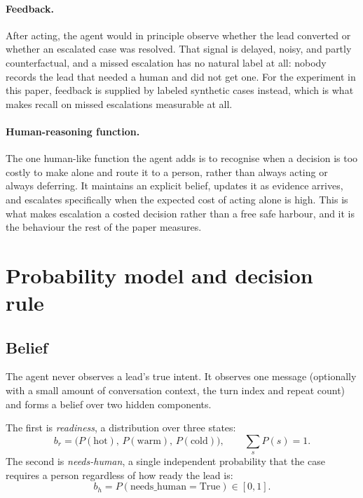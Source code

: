 \documentclass{article}
\begin{document}
\paragraph{Feedback.} After acting, the agent would in principle observe whether
the lead converted or whether an escalated case was resolved. That signal is
delayed, noisy, and partly counterfactual, and a missed escalation has no natural
label at all: nobody records the lead that needed a human and did not get one. For
the experiment in this paper, feedback is supplied by labeled synthetic cases
instead, which is what makes recall on missed escalations measurable at all.

\paragraph{Human-reasoning function.} The one human-like function the agent adds
is to recognise when a decision is too costly to make alone and route it to a
person, rather than always acting or always deferring. It maintains an explicit
belief, updates it as evidence arrives, and escalates specifically when the
expected cost of acting alone is high. This is what makes escalation a costed
decision rather than a free safe harbour, and it is the behaviour the rest of the
paper measures.

\section{Probability model and decision rule}
\label{sec:model}

\subsection{Belief}
The agent never observes a lead's true intent. It observes one message
(optionally with a small amount of conversation context, the turn index and
repeat count) and forms a belief over two hidden components.

The first is \emph{readiness}, a distribution over three states:
\begin{equation}
b_r = \big(P(\text{hot}),\, P(\text{warm}),\, P(\text{cold})\big),
\qquad \sum_{s} P(s) = 1 .
\end{equation}
The second is \emph{needs-human}, a single independent probability that the
case requires a person regardless of how ready the lead is:
\begin{equation}
b_h = P(\text{needs\_human} = \text{True}) \in [0, 1].
\end{equation}
\end{document}
